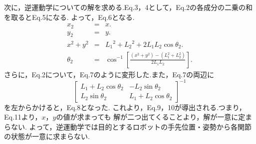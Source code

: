 \documentclass[10pt,a4j]{jsarticle}
\begin{document}
    \par 次に，逆運動学についての解を求める.Eq.3，4として，Eq.2の各成分の二乗の和を取るとEq.5になる.
    よって，Eq.6となる.
      \begin{eqnarray}
        x_{2} &=& x. \\
        y_{2} &=& y. \\
        x^{2} + y^{2} &=& {L_{1}}^{2} + {L_{2}}^{2} + 2L_{1}L_{2}\cos\theta_{2}. \\
        \theta_{2} &=& \cos^{-1}\left[ \frac{(x^2 + y^2) - (L_{1}^2 + L_{2}^2)}{2L_{1}L_{2}} \right].
      \end{eqnarray}
    さらに，Eq.2について，Eq.7のように変形した.また，Eq.7の両辺に
    \[
      \left[\begin{array}{cc}
        L_{1} + L_{2}\cos\theta_{2} & -L_{2}\sin\theta_{2} \\
        L_{2}\sin\theta_{2} & L_{1} + L_{2}\cos\theta_{2}
        \end{array}
      \right]^{-1}
    \]
    を左からかけると，Eq.8となった.
    これより，Eq.9，10が導出される.つまり，Eq.11より，$x$，$y$の値が求まっても
    解が二つ出てくることより，解が一意に定まらない.
    よって，逆運動学では目的とするロボットの手先位置・姿勢から各関節の状態が一意に求まらない.
\end{document}
